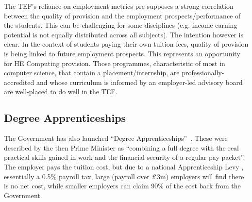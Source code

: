 \documentclass[sigconf,anonymous]{acmart}
\begin{document}

The TEF's reliance on employment metrics pre-supposes a strong
correlation between the quality of provision and the employment
prospects/performance of the students. This can be challenging for
some disciplines (e.g. income earning potential is not equally
distributed across all subjects). The intention however is clear. In
the context of students paying their own tuition fees, quality of
provision is being linked to future employment prospects. This
represents an opportunity for HE Computing provision. Those
programmes, characteristic of most in computer science, that contain a
placement/internship, are professionally-accredited and whose
curriculum is informed by an employer-led advisory board are
well-placed to do well in the TEF.

\subsection{Degree Apprenticeships}\label{sec:DA}

The Government has also launched ``Degree
Apprenticeships''~\cite{BIS2015a}. These were described by the then
Prime Minister as ``combining a full degree with the real practical
skills gained in work and the financial security of a regular pay
packet''. The employer pays the tuition cost, but due to a national
Apprenticeship Levy \cite{HMRC2016a}, essentially a 0.5\% payroll tax,
large (payroll over \pounds3m) employers will find there is no net
cost, while smaller employers can claim 90\% of the cost back from the
Government.
\end{document}
